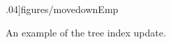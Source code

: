 \begin{figure}[ht]
.04\linewidth]{figures/movedownEmp}
    \caption{An example of the tree index update.}
    \label{fig:movedownEmp}
\end{figure}


